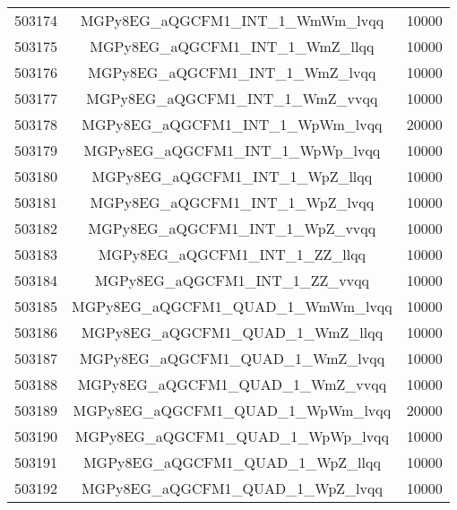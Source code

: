 \begin{table}[!htbp]
\begin{center}
\begin{tabular}{c|c|c}
503174 & MGPy8EG\_aQGCFM1\_INT\_1\_WmWm\_lvqq    & 10000 \\
503175 & MGPy8EG\_aQGCFM1\_INT\_1\_WmZ\_llqq     & 10000 \\
503176 & MGPy8EG\_aQGCFM1\_INT\_1\_WmZ\_lvqq     & 10000 \\
503177 & MGPy8EG\_aQGCFM1\_INT\_1\_WmZ\_vvqq     & 10000 \\
503178 & MGPy8EG\_aQGCFM1\_INT\_1\_WpWm\_lvqq    & 20000 \\
503179 & MGPy8EG\_aQGCFM1\_INT\_1\_WpWp\_lvqq    & 10000 \\
503180 & MGPy8EG\_aQGCFM1\_INT\_1\_WpZ\_llqq     & 10000 \\
503181 & MGPy8EG\_aQGCFM1\_INT\_1\_WpZ\_lvqq     & 10000 \\
503182 & MGPy8EG\_aQGCFM1\_INT\_1\_WpZ\_vvqq     & 10000 \\
503183 & MGPy8EG\_aQGCFM1\_INT\_1\_ZZ\_llqq      & 10000 \\
503184 & MGPy8EG\_aQGCFM1\_INT\_1\_ZZ\_vvqq      & 10000 \\
503185 & MGPy8EG\_aQGCFM1\_QUAD\_1\_WmWm\_lvqq   & 10000 \\
503186 & MGPy8EG\_aQGCFM1\_QUAD\_1\_WmZ\_llqq    & 10000 \\
503187 & MGPy8EG\_aQGCFM1\_QUAD\_1\_WmZ\_lvqq    & 10000 \\
503188 & MGPy8EG\_aQGCFM1\_QUAD\_1\_WmZ\_vvqq    & 10000 \\
503189 & MGPy8EG\_aQGCFM1\_QUAD\_1\_WpWm\_lvqq   & 20000 \\
503190 & MGPy8EG\_aQGCFM1\_QUAD\_1\_WpWp\_lvqq   & 10000 \\
503191 & MGPy8EG\_aQGCFM1\_QUAD\_1\_WpZ\_llqq    & 10000 \\
503192 & MGPy8EG\_aQGCFM1\_QUAD\_1\_WpZ\_lvqq    & 10000 \\

\hline
\end{tabular}
\label{tabular:mc_samples_aqgc_1}
\end{center}
\end{table}



